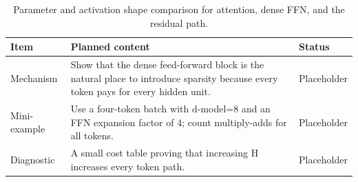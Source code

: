 \begin{table}[H]
\centering
\caption{Parameter and activation shape comparison for attention, dense FFN, and the residual path.}
\label{tab:ch01-the-dense-ffn-bottleneck}
\begin{tabularx}{\textwidth}{p{}X p{}}
\toprule
Item & Planned content & Status \\
\midrule
Mechanism & Show that the dense feed-forward block is the natural place to introduce sparsity because every token pays for every hidden unit. & Placeholder \\
Mini-example & Use a four-token batch with d-model=8 and an FFN expansion factor of 4; count multiply-adds for all tokens. & Placeholder \\
Diagnostic & A small cost table proving that increasing H increases every token path. & Placeholder \\
\bottomrule
\end{tabularx}
\end{table}
